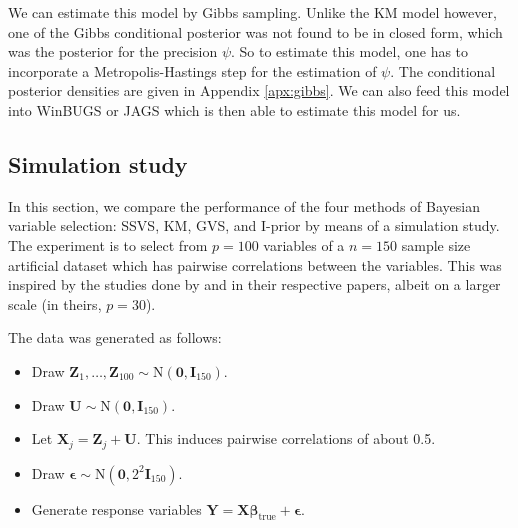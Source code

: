 We can estimate this model by Gibbs sampling. Unlike the KM model however, one of the Gibbs conditional posterior was not found to be in closed form, which was the posterior for the precision $\psi$. So to estimate this model, one has to incorporate a Metropolis-Hastings step for the estimation of $\psi$. The conditional posterior densities are given in Appendix \ref{apx:gibbs}. We can also feed this model into WinBUGS or JAGS which is then able to estimate this model for us.

\vspace{-2mm}
\subsection{Simulation study}
\vspace{-2mm}

In this section, we compare the performance of the four methods of Bayesian variable selection: SSVS, KM, GVS, and I-prior by means of a simulation study. The experiment is to select from $p=100$ variables of a $n=150$ sample size artificial dataset which has pairwise correlations between the variables. This was inspired by the studies done by \cite{George1993} and \cite{Kuo1998} in their respective papers, albeit on a larger scale (in theirs, $p=30$).

The data was generated as follows:
\begin{itemize}
	\item Draw $\mathbf Z_1, \dots, \mathbf Z_{100} \sim \text{N}(\mathbf 0, \mathbf I_{150})$.
	\item Draw $\mathbf U \sim \text{N}(\mathbf 0,\mathbf I_{150})$.
	\item Let $\mathbf X_j = \mathbf Z_j + \mathbf U$. This induces pairwise correlations of about 0.5.\footnotemark
	\item Draw $\boldsymbol \epsilon \sim \text{N}(\mathbf 0, 2^2\mathbf I_{150})$.
	\item Generate response variables $\mathbf Y = \mathbf X \boldsymbol\beta_{\text{true}} + \boldsymbol\epsilon$.
\end{itemize}


